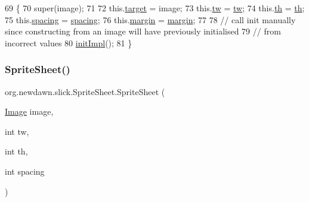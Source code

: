 \begin{DoxyCode}
69                                                                          \{
70         super(image);
71         
72         this.\mbox{\hyperlink{classorg_1_1newdawn_1_1slick_1_1_sprite_sheet_a54e0b09e9140db02bc11ac22fff5d464}{target}} = image;
73         this.\mbox{\hyperlink{classorg_1_1newdawn_1_1slick_1_1_sprite_sheet_a98ea5eda333db800a8e0ab4251bacfdc}{tw}} = \mbox{\hyperlink{classorg_1_1newdawn_1_1slick_1_1_sprite_sheet_a98ea5eda333db800a8e0ab4251bacfdc}{tw}};
74         this.\mbox{\hyperlink{classorg_1_1newdawn_1_1slick_1_1_sprite_sheet_a9bb93039202eef9a5284f5d5565b23c9}{th}} = \mbox{\hyperlink{classorg_1_1newdawn_1_1slick_1_1_sprite_sheet_a9bb93039202eef9a5284f5d5565b23c9}{th}};
75         this.\mbox{\hyperlink{classorg_1_1newdawn_1_1slick_1_1_sprite_sheet_acfe40394e52d34270bc42e936472b5a6}{spacing}} = \mbox{\hyperlink{classorg_1_1newdawn_1_1slick_1_1_sprite_sheet_acfe40394e52d34270bc42e936472b5a6}{spacing}};
76         this.\mbox{\hyperlink{classorg_1_1newdawn_1_1slick_1_1_sprite_sheet_a971a0145bb69e5bf2ae0432b7f2a69f5}{margin}} = \mbox{\hyperlink{classorg_1_1newdawn_1_1slick_1_1_sprite_sheet_a971a0145bb69e5bf2ae0432b7f2a69f5}{margin}}; 
77 
78         \textcolor{comment}{// call init manually since constructing from an image will have previously initialised}
79         \textcolor{comment}{// from incorrect values }
80         \mbox{\hyperlink{classorg_1_1newdawn_1_1slick_1_1_sprite_sheet_a66be61bdff9a452f365abe95d2b47da2}{initImpl}}();
81     \}
\end{DoxyCode}
\mbox{\label{classorg_1_1newdawn_1_1slick_1_1_sprite_sheet_a3845be1d373a8929503922089a39afa5}} 
\subsubsection{\texorpdfstring{Sprite\+Sheet()}{SpriteSheet()}\hspace{0.1cm}{\footnotesize\ttfamily [4/9]}}
{\footnotesize\ttfamily org.\+newdawn.\+slick.\+Sprite\+Sheet.\+Sprite\+Sheet (\begin{DoxyParamCaption}\item[{\mbox{\hyperlink{classorg_1_1newdawn_1_1slick_1_1_image}{Image}}}]{image,  }\item[{int}]{tw,  }\item[{int}]{th,  }\item[{int}]{spacing }\end{DoxyParamCaption})\hspace{0.3cm}{\ttfamily [inline]}}


